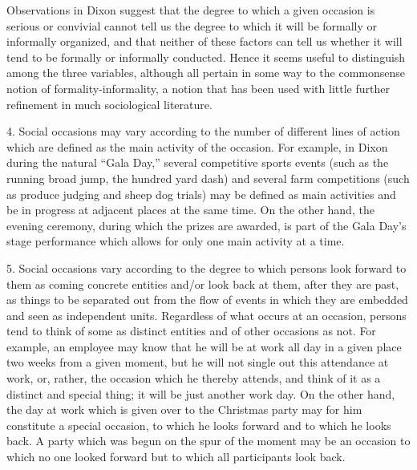 \documentclass[openany,nobib]{tufte-book}
\begin{document}
Observations in Dixon suggest that the degree to which a given occasion
is serious or convivial cannot tell us the degree to which it will be
formally or informally organized, and that neither of these factors can
tell us whether it will tend to be formally or informally conducted.
Hence it seems useful to distinguish among the three variables, although
all pertain in some way to the commonsense notion of
formality-informality, a notion that has been used with little further
refinement in much sociological literature.

4. Social occasions may vary according to the number of different lines
of action which are defined as the main activity of the occasion. For
example, in Dixon during the natural ``Gala Day,'' several competitive
sports events (such as the running broad jump, the hundred yard dash)
and several farm competitions (such as produce judging and sheep dog
trials) may be defined as main activities and be in progress at adjacent
places at the same time. On the other hand, the evening ceremony, during
which the prizes are awarded, is part of the Gala Day's stage
performance which allows for only one main activity at a time.

5. Social occasions vary according to the degree to which persons look
forward to them as coming concrete entities and/or look back at them,
after they are past, as things to be separated out from the flow of
events in which they are embedded and seen as independent units.
Regardless of what occurs at an occasion, persons tend to think of some
as distinct entities and of other occasions as not. For example, an
employee may know that he will be at work all day in a given place two
weeks from a given moment, but he will not single out this attendance at
work, or, rather, the occasion which he thereby attends, and think of it
as a distinct and special thing; it will be just another work day. On
the other hand, the day at work which is given over to the Christmas
party may for him constitute a special occasion, to which he looks
forward and to which he looks back. A party which was begun on the spur
of the moment may be an occasion to which no one looked forward but to
which all participants look back.
\end{document}

